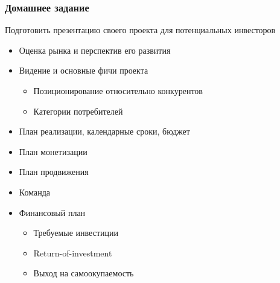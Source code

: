 \documentclass[xetex,mathserif,serif]{beamer}
\begin{document}
	\begin{frame}
		\frametitle{Домашнее задание}
		Подготовить презентацию своего проекта для потенциальных инвесторов
		\begin{itemize}
			\item Оценка рынка и перспектив его развития
			\item Видение и основные фичи проекта
			\begin{itemize}
				\item Позиционирование относительно конкурентов
				\item Категории потребителей
			\end{itemize}
			\item План реализации, календарные сроки, бюджет
			\item План монетизации
			\item План продвижения
			\item Команда
			\item Финансовый план
			\begin{itemize}
				\item Требуемые инвестиции
				\item Return-of-investment
				\item Выход на самоокупаемость
			\end{itemize}
		\end{itemize}
	\end{frame}
\end{document}
